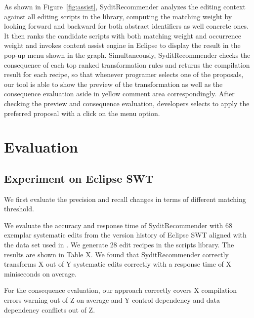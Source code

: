 As shown in Figure~\ref{fig:assist}, SyditRecommender analyzes the editing context against all editing scripts in the library, computing the matching weight by looking forward and backward for both abstract identifiers as well concrete ones. It then ranks the candidate scripts with both matching weight and occurrence weight and invokes content assist engine in Eclipse to display the result in the pop-up menu shown in the graph. Simultaneously, SyditRecommender checks the consequence of each top ranked transformation rules and returns the compilation result for each recipe, so that whenever programer selects one of the proposals, our tool is able to show the preview of the transformation as well as the consequence evaluation aside in yellow comment area correspondingly. After checking the preview and consequence evaluation, developers selects to apply the preferred proposal with a click on the menu option.

\section{Evaluation}\label{sec:evaluate}
\subsection{Experiment on Eclipse SWT}

We first evaluate the precision and recall changes in terms of different matching threshold.  

We evaluate the accuracy and response time of SyditRecommender with 68 exemplar systematic edits from the version history of Eclipse SWT  aligned with the data set used in \cite{meng:lase}. We generate 28 edit recipes in the scripts library. The results are shown in Table X. We found that SyditRecommender correctly transforms X out of Y systematic edits correctly with a response time of X miniseconds on average. 

For the consequence evaluation, our approach correctly covers X compilation errors warning out of Z on average and Y control dependency and data dependency conflicts out of Z. 


